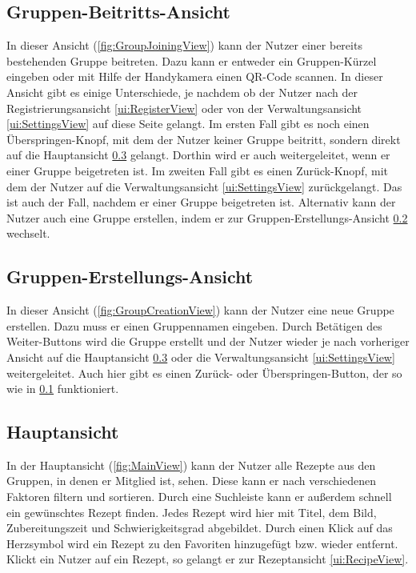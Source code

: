 \documentclass[parskip=full]{scrartcl}
\begin{document}
\subsection{Gruppen-Beitritts-Ansicht}
\label{ui:GroupJoiningView}
In dieser Ansicht (\autoref{fig:GroupJoiningView}) kann der Nutzer einer bereits bestehenden Gruppe beitreten. Dazu kann er entweder ein Gruppen-Kürzel eingeben oder mit Hilfe der Handykamera einen QR-Code scannen. In dieser Ansicht gibt es einige Unterschiede, je nachdem ob der Nutzer nach der Registrierungsansicht \ref{ui:RegisterView} oder von der Verwaltungsansicht \ref{ui:SettingsView} auf diese Seite gelangt. Im ersten Fall gibt es noch einen Überspringen-Knopf, mit dem der Nutzer keiner Gruppe beitritt, sondern direkt auf die Hauptansicht \ref{ui:MainView} gelangt. Dorthin wird er auch weitergeleitet, wenn er einer Gruppe beigetreten ist. Im zweiten Fall gibt es einen Zurück-Knopf, mit dem der Nutzer auf die Verwaltungsansicht \ref{ui:SettingsView} zurückgelangt. Das ist auch der Fall, nachdem er einer Gruppe beigetreten ist.
Alternativ kann der Nutzer auch eine Gruppe erstellen, indem er zur Gruppen-Erstellungs-Ansicht \ref{ui:GroupCreationView} wechselt.

\subsection{Gruppen-Erstellungs-Ansicht}
\label{ui:GroupCreationView}
In dieser Ansicht (\autoref{fig:GroupCreationView}) kann der Nutzer eine neue Gruppe erstellen. Dazu muss er einen Gruppennamen eingeben. Durch Betätigen des Weiter-Buttons wird die Gruppe erstellt und der Nutzer wieder je nach vorheriger Ansicht auf die Hauptansicht \ref{ui:MainView} oder die Verwaltungsansicht \ref{ui:SettingsView} weitergeleitet. Auch hier gibt es einen Zurück- oder Überspringen-Button, der so wie in \ref{ui:GroupJoiningView} funktioniert.

\subsection{Hauptansicht}
\label{ui:MainView}
In der Hauptansicht (\autoref{fig:MainView}) kann der Nutzer alle Rezepte aus den Gruppen, in denen er Mitglied ist, sehen. Diese kann er nach verschiedenen Faktoren filtern und sortieren. Durch eine Suchleiste kann er außerdem schnell ein gewünschtes Rezept finden. Jedes Rezept wird hier mit Titel, dem Bild, Zubereitungszeit und Schwierigkeitsgrad abgebildet. Durch einen Klick auf das Herzsymbol wird ein Rezept zu den Favoriten hinzugefügt bzw. wieder entfernt. Klickt ein Nutzer auf ein Rezept, so gelangt er zur Rezeptansicht \ref{ui:RecipeView}.
\end{document}
